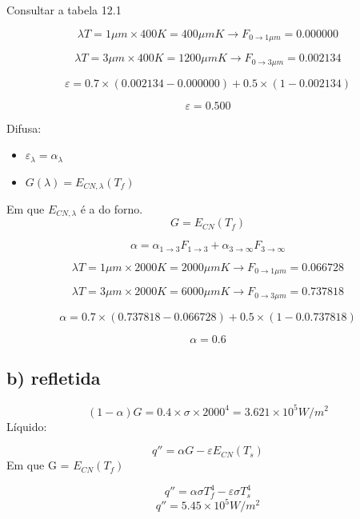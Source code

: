 Consultar a tabela 12.1

\[
\lambda T = 1 \mu m \times 400K = 400 \mu mK \rightarrow F_{0 \rightarrow 1\mu m} = 0.000000
\]

\[
\lambda T = 3 \mu m \times 400K = 1200 \mu mK \rightarrow F_{0 \rightarrow 3\mu m} = 0.002134
\]

\[
\varepsilon = 0.7 \times (0.002134 - 0.000000)+0.5 \times (1-0.002134)
\]

\[\varepsilon = 0.500\]



Difusa:

\begin{itemize}
\item $\varepsilon _{\lambda} = \alpha _{\lambda}$
\item $G(\lambda) = E_{CN,\lambda}(T_{f})$
\end{itemize}

Em que $E_{CN,\lambda}$ é a do forno.
\[G = E_{CN}(T_{f})\]

\[
\alpha = \alpha _{1 \rightarrow 3}F_{1 \rightarrow 3} + \alpha _{3 \rightarrow \infty}F_{3 \rightarrow \infty}
\]

\[
\lambda T = 1 \mu m \times 2000K = 2000 \mu mK \rightarrow F_{0 \rightarrow 1\mu m} = 0.066728
\]

\[
\lambda T = 3 \mu m \times 2000K = 6000 \mu mK \rightarrow F_{0 \rightarrow 3\mu m} = 0.737818
\]

\[
\alpha = 0.7 \times (0.737818 - 0.066728)+0.5 \times (1-0.0.737818)
\]

\[\alpha = 0.6\]


\subsection{b) refletida}

\[(1-\alpha)G=0.4 \times \sigma \times 2000^{4} = 3.621 \times 10 ^{5} W/m^{2}\]
Líquido:

\[q'' = \alpha G - \varepsilon E_{CN}(T_{s})\]
Em 	que G = $E_{CN}(T_{f})$

\[q'' = \alpha \sigma T_{f}^{4} - \varepsilon  \sigma T_{s}^{4}\]
\[q'' = 5.45 \times 10^{5} W/m^{2}\]

